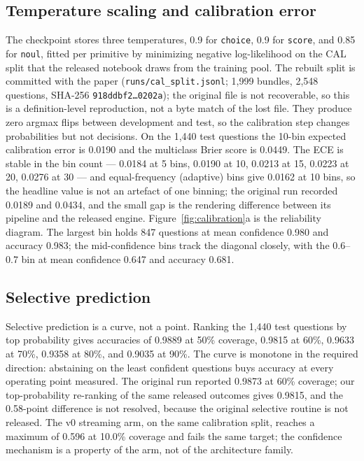 \subsection{Temperature scaling and calibration error}
The checkpoint stores three temperatures, 0.9 for \texttt{choice}, 0.9 for \texttt{score}, and
0.85 for \texttt{noul}, fitted per primitive by minimizing negative log-likelihood on the CAL split
that the released notebook draws from the training pool. The rebuilt split is committed
with the paper (\texttt{runs/cal\_split.jsonl}; 1{,}999 bundles, 2{,}548 questions,
SHA-256 \texttt{918ddbf2\ldots0202a}); the original file is not recoverable, so
this is a definition-level reproduction, not a byte match of the lost file. They produce zero argmax flips between
development and test, so the calibration step changes probabilities but not decisions. On the
1{,}440 test questions the 10-bin expected calibration error is 0.0190 and the multiclass Brier
score is 0.0449. The ECE is stable in the bin count --- 0.0184 at 5 bins, 0.0190 at 10, 0.0213 at
15, 0.0223 at 20, 0.0276 at 30 --- and equal-frequency (adaptive) bins give 0.0162 at 10 bins, so
the headline value is not an artefact of one binning; the original run recorded 0.0189 and 0.0434, and the small gap is the rendering
difference between its pipeline and the released engine. Figure~\ref{fig:calibration}a is the
reliability diagram. The largest bin holds 847 questions at mean confidence 0.980 and accuracy
0.983; the mid-confidence bins track the diagonal closely, with the 0.6--0.7 bin at mean
confidence 0.647 and accuracy 0.681.

\subsection{Selective prediction}
Selective prediction is a curve, not a point. Ranking the 1{,}440 test questions by top probability
gives accuracies of 0.9889 at 50\% coverage, 0.9815 at 60\%, 0.9633 at 70\%, 0.9358 at 80\%, and
0.9035 at 90\%. The curve is monotone in the required direction: abstaining on the least confident
questions buys accuracy at every operating point measured. The original run reported 0.9873 at 60\%
coverage; our top-probability re-ranking of the same released outcomes gives 0.9815, and the
0.58-point difference is not resolved, because the original selective routine is not released.
The v0 streaming arm, on the same calibration split, reaches a maximum of 0.596 at 10.0\% coverage
and fails the same target; the confidence mechanism is a property of the \vsix{} arm, not of the
architecture family.

